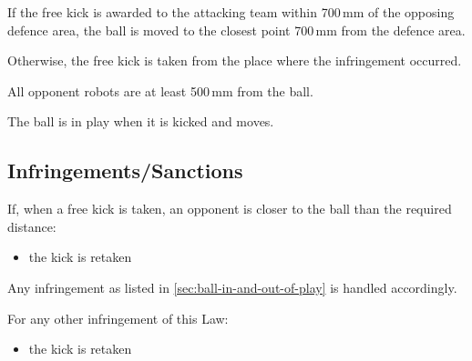 If the free kick is awarded to the attacking team within 700\,mm of the opposing defence area, the ball is moved to the closest point 700\,mm from the defence area.

Otherwise, the free kick is taken from the place where the infringement occurred.

All opponent robots are at least 500\,mm from the ball.

The ball is in play when it is kicked and moves.

\subsection{Infringements/Sanctions}
If, when a free kick is taken, an opponent is closer to the ball than the required distance:
\begin{itemize}
\item the kick is retaken
\end{itemize}

Any infringement as listed in \autoref{sec:ball-in-and-out-of-play} is handled accordingly.

For any other infringement of this Law:
\begin{itemize}
\item the kick is retaken
\end{itemize}
